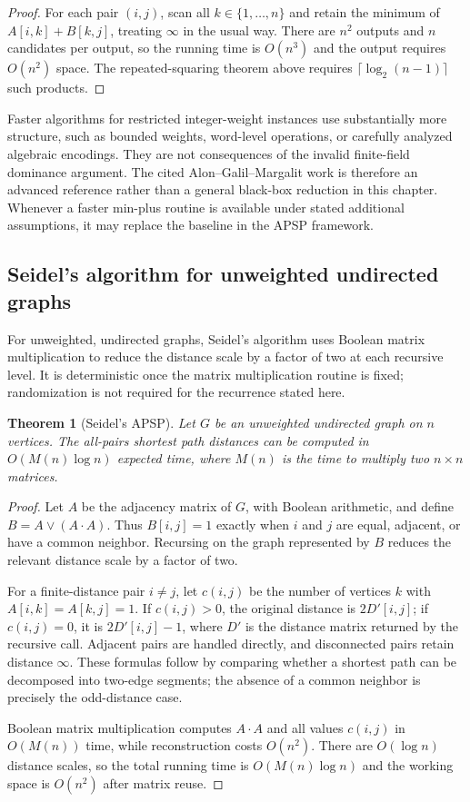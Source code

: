\documentclass[twoside,12pt]{book}
\theoremstyle{plain}
\newtheorem{theorem}{Theorem}[chapter]
\theoremstyle{definition}
\theoremstyle{remark}
\begin{document}
\begin{proof}
For each pair $(i,j)$, scan all $k\in\{1,\ldots,n\}$ and retain the
minimum of $A[i,k]+B[k,j]$, treating $\infty$ in the usual way. There are
$n^2$ outputs and $n$ candidates per output, so the running time is
$O(n^3)$ and the output requires $O(n^2)$ space. The repeated-squaring
theorem above requires $\lceil\log_2(n-1)\rceil$ such products.
\end{proof}

Faster algorithms for restricted integer-weight instances use substantially
more structure, such as bounded weights, word-level operations, or carefully
analyzed algebraic encodings. They are not consequences of the invalid
finite-field dominance argument. The cited Alon--Galil--Margalit work is
therefore an advanced reference rather than a general black-box reduction in
this chapter. Whenever a faster min-plus routine is available under stated
additional assumptions, it may replace the baseline in the APSP framework.

\subsection{Seidel's algorithm for unweighted undirected graphs}

For unweighted, undirected graphs, Seidel's algorithm uses Boolean matrix
multiplication to reduce the distance scale by a factor of two at each
recursive level. It is deterministic once the matrix multiplication routine
is fixed; randomization is not required for the recurrence stated here.

\begin{theorem}[Seidel's APSP]
\label{thm:seidel-apsp}
Let $G$ be an unweighted undirected graph on $n$ vertices. The all-pairs shortest path distances can be computed in $O(M(n) \log n)$ expected time, where $M(n)$ is the time to multiply two $n \times n$ matrices.
\end{theorem}

\begin{proof}
Let $A$ be the adjacency matrix of $G$, with Boolean arithmetic, and define
$B=A\lor(A\cdot A)$. Thus $B[i,j]=1$ exactly when $i$ and $j$ are equal,
adjacent, or have a common neighbor. Recursing on the graph represented by
$B$ reduces the relevant distance scale by a factor of two.

For a finite-distance pair $i\ne j$, let $c(i,j)$ be the number of vertices
$k$ with $A[i,k]=A[k,j]=1$. If $c(i,j)>0$, the original distance is
$2D'[i,j]$; if $c(i,j)=0$, it is $2D'[i,j]-1$, where $D'$ is the distance
matrix returned by the recursive call. Adjacent pairs are handled directly,
and disconnected pairs retain distance $\infty$. These formulas follow by
comparing whether a shortest path can be decomposed into two-edge segments;
the absence of a common neighbor is precisely the odd-distance case.

Boolean matrix multiplication computes $A\cdot A$ and all values $c(i,j)$ in
$O(M(n))$ time, while reconstruction costs $O(n^2)$. There are
$O(\log n)$ distance scales, so the total running time is
$O(M(n)\log n)$ and the working space is $O(n^2)$ after matrix reuse.
\end{proof}
\end{document}
